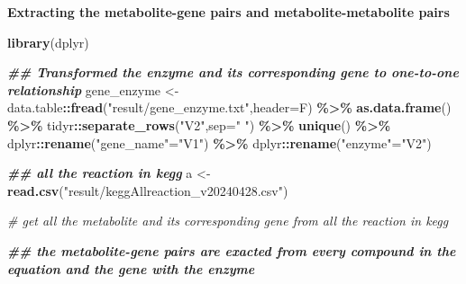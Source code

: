 \documentclass[
]{book}
\newenvironment{Shaded}{\begin{snugshade}}{\end{snugshade}}
\newcommand{\AttributeTok}[1]{\textcolor[rgb]{0.13,0.29,0.53}{#1}}
\newcommand{\CommentTok}[1]{\textcolor[rgb]{0.56,0.35,0.01}{\textit{#1}}}
\newcommand{\DocumentationTok}[1]{\textcolor[rgb]{0.56,0.35,0.01}{\textbf{\textit{#1}}}}
\newcommand{\FunctionTok}[1]{\textcolor[rgb]{0.13,0.29,0.53}{\textbf{#1}}}
\newcommand{\NormalTok}[1]{#1}
\newcommand{\OtherTok}[1]{\textcolor[rgb]{0.56,0.35,0.01}{#1}}
\newcommand{\SpecialCharTok}[1]{\textcolor[rgb]{0.81,0.36,0.00}{\textbf{#1}}}
\newcommand{\StringTok}[1]{\textcolor[rgb]{0.31,0.60,0.02}{#1}}
\begin{document}
\textbf{Extracting the metabolite-gene pairs and metabolite-metabolite pairs}

\begin{Shaded}
\begin{Highlighting}[]
\FunctionTok{library}\NormalTok{(dplyr)}

\DocumentationTok{\#\# Transformed the enzyme and its corresponding gene to one{-}to{-}one relationship}
\NormalTok{gene\_enzyme }\OtherTok{\textless{}{-}}\NormalTok{ data.table}\SpecialCharTok{::}\FunctionTok{fread}\NormalTok{(}\StringTok{"result/gene\_enzyme.txt"}\NormalTok{,}\AttributeTok{header=}\NormalTok{F) }\SpecialCharTok{\%\textgreater{}\%}
  \FunctionTok{as.data.frame}\NormalTok{() }\SpecialCharTok{\%\textgreater{}\%}
\NormalTok{  tidyr}\SpecialCharTok{::}\FunctionTok{separate\_rows}\NormalTok{(}\StringTok{"V2"}\NormalTok{,}\AttributeTok{sep=}\StringTok{" "}\NormalTok{) }\SpecialCharTok{\%\textgreater{}\%}
  \FunctionTok{unique}\NormalTok{() }\SpecialCharTok{\%\textgreater{}\%}
\NormalTok{  dplyr}\SpecialCharTok{::}\FunctionTok{rename}\NormalTok{(}\StringTok{"gene\_name"}\OtherTok{=}\StringTok{"V1"}\NormalTok{) }\SpecialCharTok{\%\textgreater{}\%}
\NormalTok{  dplyr}\SpecialCharTok{::}\FunctionTok{rename}\NormalTok{(}\StringTok{"enzyme"}\OtherTok{=}\StringTok{"V2"}\NormalTok{)}

\DocumentationTok{\#\# all the reaction in kegg}
\NormalTok{a }\OtherTok{\textless{}{-}} \FunctionTok{read.csv}\NormalTok{(}\StringTok{"result/keggAllreaction\_v20240428.csv"}\NormalTok{)}

\CommentTok{\# get all the metabolite and its corresponding gene from all the reaction in kegg}

\DocumentationTok{\#\# the metabolite{-}gene pairs are exacted from every compound in the equation and the gene with the enzyme}


\end{Highlighting}
\end{Shaded}
\end{document}
